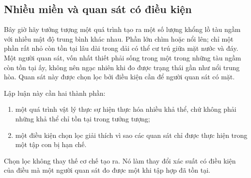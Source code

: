 \begin{classroomqa}
\end{classroomqa}

\subsection{Nhiều miền và quan sát có điều kiện}

Bây giờ hãy tưởng tượng một quá trình tạo ra một số lượng khổng lồ tàu ngầm với nhiều mật độ trung bình khác nhau. Phần lớn chìm hoặc nổi lên; chỉ một phần rất nhỏ còn tồn tại lâu dài trong dải có thể cư trú giữa mặt nước và đáy. Một người quan sát, vốn nhất thiết phải sống trong một trong những tàu ngầm còn tồn tại ấy, không nên ngạc nhiên khi đo được trạng thái gần như nổi trung hòa. Quan sát này được chọn lọc bởi điều kiện cần để người quan sát có mặt.

Lập luận này cần hai thành phần:
\begin{enumerate}
\item một quá trình vật lý thực sự hiện thực hóa nhiều khả thể, chứ không phải những khả thể chỉ tồn tại trong tưởng tượng;
\item một điều kiện chọn lọc giải thích vì sao các quan sát chỉ được thực hiện trong một tập con bị hạn chế.
\end{enumerate}
Chọn lọc không thay thế cơ chế tạo ra. Nó làm thay đổi xác suất có điều kiện của điều mà một người quan sát đo được một khi tập hợp đã tồn tại.

\begin{classroomqa}
\end{classroomqa}

